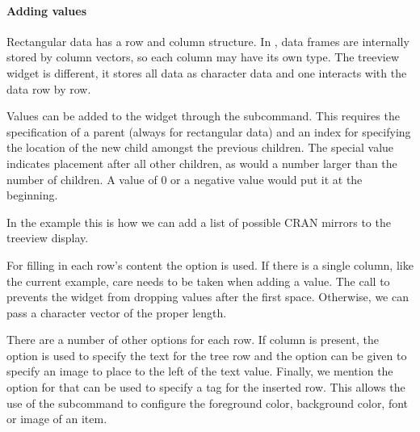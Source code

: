 \paragraph{Adding values}

Rectangular data has a row and column structure. In \R, data frames
are internally stored by column vectors, so each column may have its
own type. The treeview widget is different, it stores all data as
character data and one interacts with the data row by row.

Values can be added to the widget through the
subcommand. This requires the specification of a parent (always
\qcode{} for rectangular data) and an index for specifying the
location of the new child amongst the previous children. The special
value  indicates placement after all other children, as
would a number larger than the number of children. A value of 0 or a
negative value would put it at the beginning.


In the example this is how we can add a list of possible CRAN mirrors
to the treeview display.
\begin{Schunk}
\end{Schunk}

For filling in each row's content the  option is
used. If there is a single column, like the current example, care
needs to be taken when adding a value. The call to
 prevents the widget from dropping values after
the first space. Otherwise, we can pass a character vector of the
proper length.


There are a number of other options for each row. If column 
is present, the  option is used to specify the text for the
tree row and the option  can be given to specify an image
to place to the left of the text value. Finally, we mention the
 option for  that can be used to specify a tag
for the inserted row. This allows the use of the subcommand
 to configure the foreground
color, background color, font or image of an item.



